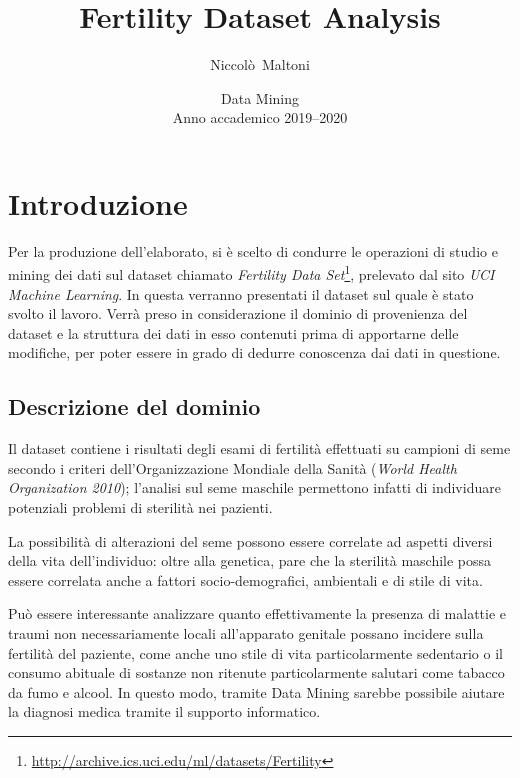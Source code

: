\documentclass[a4paper,11pt,twoside,notitlepage,final]{scrartcl}
\title{\LARGE{\textbf{Fertility Dataset Analysis}}}
\author{Niccolò~Maltoni}
\date{%
  \small{Data Mining}\\%
  \small{Anno accademico 2019--2020}
}
\begin{document}
\maketitle

\section{Introduzione}\label{sec:intro}

Per la produzione dell'elaborato, si è scelto di condurre le operazioni di studio e mining dei dati sul dataset chiamato \emph{Fertility Data Set}\footnote{\url{http://archive.ics.uci.edu/ml/datasets/Fertility}}, prelevato dal sito \emph{UCI Machine Learning}.
In questa  verranno presentati il dataset sul quale è stato svolto il lavoro.
Verrà preso in considerazione il dominio di provenienza del dataset e la struttura dei dati in esso contenuti prima di apportarne delle modifiche,
per poter essere in grado di dedurre conoscenza dai dati in questione.

\subsection{Descrizione del dominio}

Il dataset contiene i risultati degli esami di fertilità effettuati su campioni di seme secondo i criteri dell'Organizzazione Mondiale della Sanità (\emph{World Health Organization 2010});
l'analisi sul seme maschile permettono infatti di individuare potenziali problemi di sterilità nei pazienti.

La possibilità di alterazioni del seme possono essere correlate ad aspetti diversi della vita dell'individuo:
oltre alla genetica, pare che la sterilità maschile possa essere correlata anche a fattori socio-demografici, ambientali e di stile di vita.

Può essere interessante analizzare quanto effettivamente la presenza di malattie e traumi non necessariamente locali all'apparato genitale possano incidere sulla fertilità del paziente,
come anche uno stile di vita particolarmente sedentario o il consumo abituale di sostanze non ritenute particolarmente salutari come tabacco da fumo e alcool.
In questo modo, tramite Data Mining sarebbe possibile aiutare la diagnosi medica tramite il supporto informatico.
\end{document}
